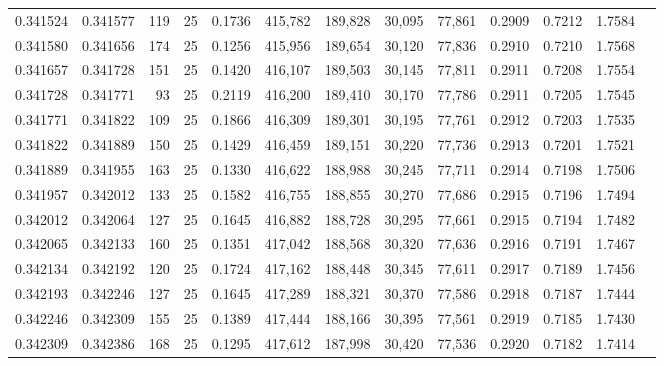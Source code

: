 \begin{tabular}{rrrrrrrrrrrrr}
0.341524 & 0.341577 &   119 &  25 &                                     0.1736 & 415,782 & 189,828 &  30,095 &  77,861 & 0.2909 & 0.7212 & 1.7584 \\
0.341580 & 0.341656 &   174 &  25 &                                     0.1256 & 415,956 & 189,654 &  30,120 &  77,836 & 0.2910 & 0.7210 & 1.7568 \\
0.341657 & 0.341728 &   151 &  25 &                                     0.1420 & 416,107 & 189,503 &  30,145 &  77,811 & 0.2911 & 0.7208 & 1.7554 \\
0.341728 & 0.341771 &    93 &  25 &                                     0.2119 & 416,200 & 189,410 &  30,170 &  77,786 & 0.2911 & 0.7205 & 1.7545 \\
0.341771 & 0.341822 &   109 &  25 &                                     0.1866 & 416,309 & 189,301 &  30,195 &  77,761 & 0.2912 & 0.7203 & 1.7535 \\
0.341822 & 0.341889 &   150 &  25 &                                     0.1429 & 416,459 & 189,151 &  30,220 &  77,736 & 0.2913 & 0.7201 & 1.7521 \\
0.341889 & 0.341955 &   163 &  25 &                                     0.1330 & 416,622 & 188,988 &  30,245 &  77,711 & 0.2914 & 0.7198 & 1.7506 \\
0.341957 & 0.342012 &   133 &  25 &                                     0.1582 & 416,755 & 188,855 &  30,270 &  77,686 & 0.2915 & 0.7196 & 1.7494 \\
0.342012 & 0.342064 &   127 &  25 &                                     0.1645 & 416,882 & 188,728 &  30,295 &  77,661 & 0.2915 & 0.7194 & 1.7482 \\
0.342065 & 0.342133 &   160 &  25 &                                     0.1351 & 417,042 & 188,568 &  30,320 &  77,636 & 0.2916 & 0.7191 & 1.7467 \\
0.342134 & 0.342192 &   120 &  25 &                                     0.1724 & 417,162 & 188,448 &  30,345 &  77,611 & 0.2917 & 0.7189 & 1.7456 \\
0.342193 & 0.342246 &   127 &  25 &                                     0.1645 & 417,289 & 188,321 &  30,370 &  77,586 & 0.2918 & 0.7187 & 1.7444 \\
0.342246 & 0.342309 &   155 &  25 &                                     0.1389 & 417,444 & 188,166 &  30,395 &  77,561 & 0.2919 & 0.7185 & 1.7430 \\
0.342309 & 0.342386 &   168 &  25 &                                     0.1295 & 417,612 & 187,998 &  30,420 &  77,536 & 0.2920 & 0.7182 & 1.7414 \\

\end{tabular}
